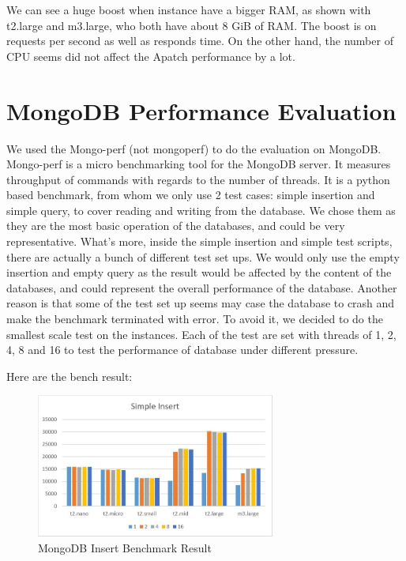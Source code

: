 \documentclass[10pt,letterpaper]{article}
\begin{document}
We can see a huge boost when instance have a bigger RAM, as shown with t2.large and m3.large, who both have about 8 GiB of RAM. The boost is on requests per second as well as responds time. On the other hand, the number of CPU seems did not affect the Apatch performance by a lot.  

\section{MongoDB Performance Evaluation}
We used the Mongo-perf (not mongoperf) to do the evaluation on MongoDB. Mongo-perf is a micro benchmarking tool for the MongoDB server. It measures throughput of commands with regards to the number of threads. It is a python based benchmark, from whom we only use 2 test cases: simple insertion and simple query, to cover reading and writing from the database. We chose them as they are the most basic operation of the databases, and could be very representative. What’s more, inside the simple insertion and simple test scripts, there are actually a bunch of different test set ups. We would only use the empty insertion and empty query as the result would be affected by the content of the databases, and could represent the overall performance of the database. Another reason is that some of the test set up seems may case the database to crash and make the benchmark terminated with error. To avoid it, we decided to do the smallest scale test on the instances. Each of the test are set with threads of 1, 2, 4, 8 and 16 to test the performance of database under different pressure.

Here are the bench result: 

	\begin{figure}[!h]
	\includegraphics[width=0.7\textwidth]{mongo_insert.jpg}
	\centering
	\caption {MongoDB Insert Benchmark Result}
	\end{figure}
	
\end{document}
